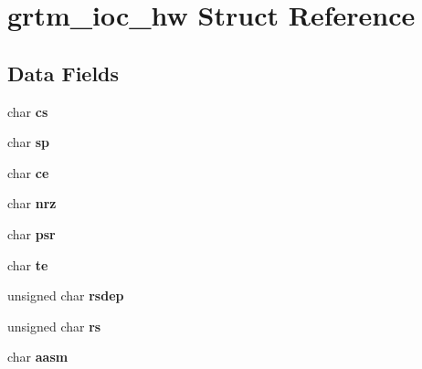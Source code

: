 \hypertarget{structgrtm__ioc__hw}{}\section{grtm\+\_\+ioc\+\_\+hw Struct Reference}
\label{structgrtm__ioc__hw}
\subsection*{Data Fields}
\begin{DoxyCompactItemize}
\item 
\mbox{\label{structgrtm__ioc__hw_a6cc54026c791b17f11572c2045056efe}} 
char {\bfseries cs}
\item 
\mbox{\label{structgrtm__ioc__hw_aaa6d6f6b1ec9bc24a765e6b602fb444f}} 
char {\bfseries sp}
\item 
\mbox{\label{structgrtm__ioc__hw_a1c3e5e00cdc9c24cee1dc669b3f43e15}} 
char {\bfseries ce}
\item 
\mbox{\label{structgrtm__ioc__hw_a5aae9df55d6e5f184fd40630bba7a4e3}} 
char {\bfseries nrz}
\item 
\mbox{\label{structgrtm__ioc__hw_a109217650d49e5d3ba636e61842695f3}} 
char {\bfseries psr}
\item 
\mbox{\label{structgrtm__ioc__hw_acb0be99079b3be80fbb12c892050b94a}} 
char {\bfseries te}
\item 
\mbox{\label{structgrtm__ioc__hw_a6f1114274b5e88543de7914375a663d5}} 
unsigned char {\bfseries rsdep}
\item 
\mbox{\label{structgrtm__ioc__hw_a88c81dab384409cabf86230bf4ba565e}} 
unsigned char {\bfseries rs}
\item 
\mbox{\label{structgrtm__ioc__hw_a9039a0f05c746f3185522323810c006d}} 
char {\bfseries aasm}
\item 
\mbox{\label{structgrtm__ioc__hw_a7e7ba60ab96673d802dfa8673c5d9546}} 

\end{DoxyCompactItemize}

